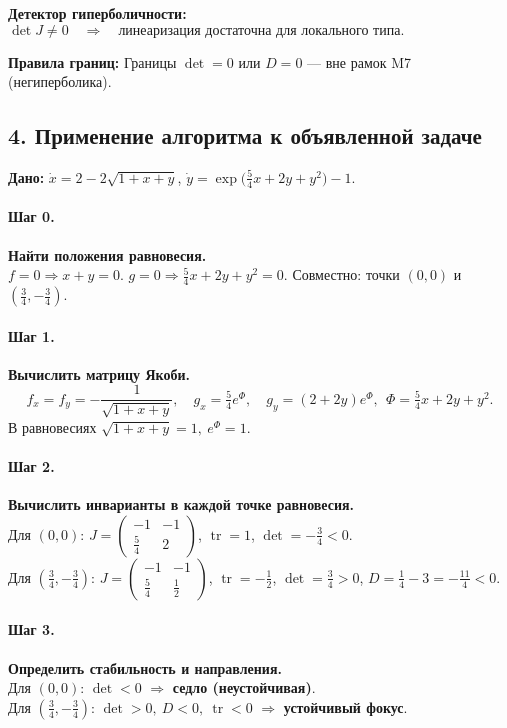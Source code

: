 \textbf{Детектор гиперболичности:} \(\det J\neq 0\quad\Rightarrow\quad\text{линеаризация достаточна для локального типа.}\)

\textbf{Правила границ:} Границы \(\det=0\) или \(D=0\) — вне рамок M7 (негиперболика).

\subsection*{4. Применение алгоритма к объявленной задаче}

\textbf{Дано:} \(\dot{x}=2-2\sqrt{1+x+y}\), \(\dot{y}=\exp\!\bigl(\tfrac{5}{4}x+2y+y^{2}\bigr)-1\).

\paragraph{Шаг 0.} \textbf{Найти положения равновесия.}\\
\(f=0 \Rightarrow x+y=0\).
\(g=0 \Rightarrow \tfrac{5}{4}x+2y+y^2=0\).
Совместно: точки \((0,0)\) и \((\tfrac{3}{4},-\tfrac{3}{4})\).

\paragraph{Шаг 1.} \textbf{Вычислить матрицу Якоби.}\\
\[
f_x=f_y=-\frac{1}{\sqrt{1+x+y}},\quad
g_x=\tfrac{5}{4}e^{\Phi},\quad
g_y=(2+2y)e^{\Phi},\ \ \Phi=\tfrac{5}{4}x+2y+y^2.
\]
В равновесиях \(\sqrt{1+x+y}=1,\ e^{\Phi}=1\).

\paragraph{Шаг 2.} \textbf{Вычислить инварианты в каждой точке равновесия.}\\
Для \((0,0)\): \(J=\begin{pmatrix}-1&-1\\[2pt]\tfrac{5}{4}&2\end{pmatrix}\), \(\operatorname{tr}=1\), \(\det=-\tfrac{3}{4}<0\).\\
Для \((\tfrac{3}{4},-\tfrac{3}{4})\): \(J=\begin{pmatrix}-1&-1\\[2pt]\tfrac{5}{4}&\tfrac{1}{2}\end{pmatrix}\), \(\operatorname{tr}=-\tfrac{1}{2}\), \(\det=\tfrac{3}{4}>0\), \(D=\tfrac{1}{4}-3=-\tfrac{11}{4}<0\).

\paragraph{Шаг 3.} \textbf{Определить стабильность и направления.}\\
Для \((0,0)\): \(\det<0\) \(\Rightarrow\) \textbf{седло (неустойчивая)}.\\
Для \((\tfrac{3}{4},-\tfrac{3}{4})\): \(\det>0,\ D<0,\ \operatorname{tr}<0\) \(\Rightarrow\) \textbf{устойчивый фокус}.

